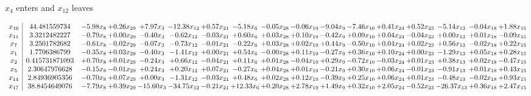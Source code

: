 \documentclass[9pt]{article}
\begin{document}
 $ x_{4} $ enters and $ x_{12} $ leaves 

 \[\begin{array}{c| c c@{\hskip 2pt} c@{\hskip 2pt} c@{\hskip 2pt} c@{\hskip 2pt} c@{\hskip 2pt} c@{\hskip 2pt} c@{\hskip 2pt} c@{\hskip 2pt} c@{\hskip 2pt} c@{\hskip 2pt} c@{\hskip 2pt} c@{\hskip 2pt} c@{\hskip 2pt} c@{\hskip 2pt} c@{\hskip 2pt} }
 x_{16}   &  44.481559734 & -5.98 x_{8} & +  0.26 x_{29} & +  7.97 x_{3} & -12.38 x_{12} & +  0.57 x_{21} & -5.18 x_{6} & -0.05 x_{28} & -0.06 x_{19} & -9.04 x_{9} & -7.46 x_{10} & +  0.41 x_{24} & +  0.52 x_{23} & -5.14 x_{13} & -0.04 x_{18} & +  1.88 x_{15}\\
 x_{11}   &  3.3212482227 & -0.79 x_{8} & +  0.00 x_{29} & -0.40 x_{3} & -0.62 x_{12} & -0.03 x_{21} & +  0.60 x_{6} & +  0.03 x_{28} & +  0.10 x_{19} & -0.42 x_{9} & +  0.09 x_{10} & +  0.04 x_{24} & -0.04 x_{23} & +  0.00 x_{13} & +  0.01 x_{18} & -0.09 x_{15}\\
 x_{7}   &  3.2501782682 & -0.61 x_{8} & -0.02 x_{29} & -0.07 x_{3} & -0.73 x_{12} & -0.01 x_{21} & -0.22 x_{6} & +  0.03 x_{28} & +  0.02 x_{19} & +  0.44 x_{9} & -0.50 x_{10} & +  0.04 x_{24} & +  0.02 x_{23} & +  0.56 x_{13} & -0.02 x_{18} & +  0.22 x_{15}\\
 x_{1}   &  1.7706386799 & -0.35 x_{8} & +  0.03 x_{29} & -0.40 x_{3} & -1.41 x_{12} & +  0.00 x_{21} & +  0.54 x_{6} & -0.00 x_{28} & +  0.11 x_{19} & -0.27 x_{9} & +  0.36 x_{10} & +  0.10 x_{24} & +  0.00 x_{23} & -1.29 x_{13} & +  0.05 x_{18} & +  0.28 x_{15}\\
 x_{2}   &  0.415731871093 & +  0.70 x_{8} & +  0.01 x_{29} & -0.24 x_{3} & +  0.66 x_{12} & -0.04 x_{21} & +  0.11 x_{6} & +  0.01 x_{28} & -0.04 x_{19} & +  0.29 x_{9} & -0.72 x_{10} & -0.03 x_{24} & +  0.01 x_{23} & +  0.38 x_{13} & +  0.02 x_{18} & -0.47 x_{15}\\
 x_{5}   &  2.30647976628 & -0.15 x_{8} & -0.01 x_{29} & +  0.24 x_{3} & +  0.20 x_{12} & +  0.07 x_{21} & -0.27 x_{6} & +  0.04 x_{28} & +  0.01 x_{19} & -0.21 x_{9} & +  0.30 x_{10} & +  0.06 x_{24} & -0.01 x_{23} & -0.91 x_{13} & +  0.01 x_{18} & +  0.43 x_{15}\\
 x_{14}   &  2.84936905356 & -0.70 x_{8} & +  0.07 x_{29} & +  0.00 x_{3} & -1.31 x_{12} & -0.03 x_{21} & +  0.48 x_{6} & +  0.02 x_{28} & +  0.12 x_{19} & -0.39 x_{9} & +  0.25 x_{10} & +  0.06 x_{24} & +  0.01 x_{23} & -0.48 x_{13} & -0.02 x_{18} & +  0.93 x_{15}\\
 x_{17}   &  38.8454649076 & -7.79 x_{8} & +  0.39 x_{29} & -15.60 x_{3} & -34.75 x_{12} & -0.21 x_{21} & + 12.33 x_{6} & +  0.20 x_{28} & +  2.78 x_{19} & +  1.49 x_{9} & +  0.32 x_{10} & +  2.05 x_{24} & -0.52 x_{23} & -26.37 x_{13} & +  0.36 x_{18} & +  2.47 x_{15}\\

\end{array}\]
\end{document}
